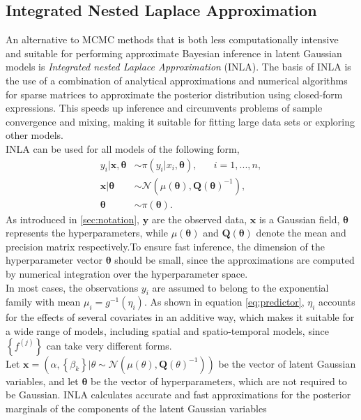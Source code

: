 \subsection{Integrated Nested Laplace Approximation}
An alternative to MCMC methods that is both less computationally intensive and suitable for performing approximate Bayesian inference in latent Gaussian models is \textit{Integrated nested Laplace Approximation} (INLA). The basis of INLA is the use of a combination of analytical approximations and numerical algorithms for sparse matrices to approximate the posterior distribution using closed-form expressions. This speeds up inference and circumvents problems of sample convergence and mixing, making it suitable for fitting large data sets or exploring other models.  \\
INLA can be used for all models of the following form,
\begin{align*}
    y_i|\pmb{x},\pmb{\theta} &\sim \pi\left(y_i|x_i,\pmb{\theta}\right), \hspace{20pt} i=1,...,n,\\
    \pmb{x}|\pmb{\theta} &\sim \mathcal{N}\left(\mu\left(\pmb{\theta}\right), \pmb{Q}\left(\pmb{\theta}\right)^{-1}\right), \\
    \pmb{\theta} &\sim \pi\left(\pmb{\theta}\right).
\end{align*}
As introduced in \autoref{sec:notation}, $\pmb{y}$ are the observed data, $\pmb{x}$ is a Gaussian field, $\pmb{\theta}$ represents the hyperparameters, while $\mu\left(\pmb{\theta}\right)$ and $\pmb{Q}\left(\pmb{\theta}\right)$ denote the mean and precision matrix respectively.To ensure fast inference, the dimension of the hyperparameter vector $\pmb{\theta}$ should be small, since the approximations are computed by numerical integration over the hyperparameter space. \\
In most cases, the observations $y_i$ are assumed to belong to the exponential family with mean $\mu_i=g^{-1}\left(\eta_i\right)$. As shown in equation \eqref{eq:predictor}, $\eta_i$ accounts for the effects of several covariates in an additive way, which makes it suitable for a wide range of models, including spatial and spatio-temporal models, since $\left\lbrace f^{(j)}\right\rbrace$ can take very different forms. \\
Let $\pmb{x}=\left(\alpha,\left\lbrace\beta_k\right\rbrace|\theta\sim\mathcal{N}\left(\mu\left(\theta\right), \pmb{Q}\left(\theta\right)^{-1}\right)\right)$ be the vector of latent Gaussian variables, and let $\pmb{\theta}$ be the vector of hyperparameters, which are not required to be Gaussian. INLA calculates accurate and fast approximations for the posterior marginals of the components of the latent Gaussian variables
